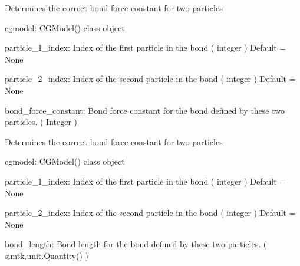 \documentclass[letterpaper,12pt,english,openany,oneside]{sphinxmanual}
\begin{document}

\begin{fulllineitems}
\label{\detokenize{cg_model:cg_model.cgmodel.get_bond_force_constant}}
Determines the correct bond force constant for two particles

cgmodel: CGModel() class object

particle\_1\_index: Index of the first particle in the bond
( integer )
Default = None

particle\_2\_index: Index of the second particle in the bond
( integer )
Default = None

bond\_force\_constant: Bond force constant for the bond defined by these two particles.
( Integer )

\end{fulllineitems}


\begin{fulllineitems}
\label{\detokenize{cg_model:cg_model.cgmodel.get_bond_length}}
Determines the correct bond force constant for two particles

cgmodel: CGModel() class object

particle\_1\_index: Index of the first particle in the bond
( integer )
Default = None

particle\_2\_index: Index of the second particle in the bond
( integer )
Default = None

bond\_length: Bond length for the bond defined by these two particles.
( simtk.unit.Quantity() )

\end{fulllineitems}

\end{document}
